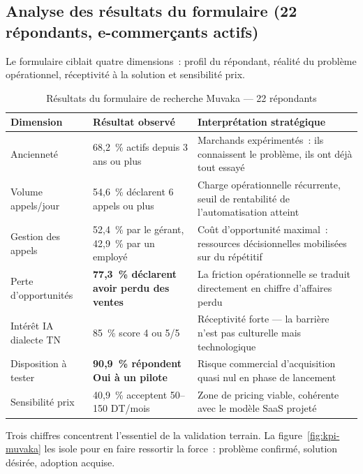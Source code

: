 \subsection{Analyse des résultats du formulaire (22 répondants, e-commerçants actifs)}
\label{section2.4.3}

Le formulaire ciblait quatre dimensions~: profil du répondant, réalité du problème opérationnel, réceptivité à la solution et sensibilité prix.

\begin{table}[H]
\centering
\caption{Résultats du formulaire de recherche Muvaka --- 22 répondants}
\smallskip
\begin{tabular}{|p{2.8cm}|p{4.2cm}|p{4.8cm}|}
\hline
\textbf{Dimension} & \textbf{Résultat observé} & \textbf{Interprétation stratégique} \\
\hline
Ancienneté & 68,2~\% actifs depuis 3 ans ou plus & Marchands expérimentés~: ils connaissent le problème, ils ont déjà tout essayé \\
\hline
Volume appels/jour & 54,6~\% déclarent 6 appels ou plus & Charge opérationnelle récurrente, seuil de rentabilité de l'automatisation atteint \\
\hline
Gestion des appels & 52,4~\% par le gérant, 42,9~\% par un employé & Coût d'opportunité maximal~: ressources décisionnelles mobilisées sur du répétitif \\
\hline
Perte d'opportunités & \textbf{77,3~\% déclarent avoir perdu des ventes} & La friction opérationnelle se traduit directement en chiffre d'affaires perdu \\
\hline
Intérêt IA dialecte TN & 85~\% score 4 ou 5/5 & Réceptivité forte --- la barrière n'est pas culturelle mais technologique \\
\hline
Disposition à tester & \textbf{90,9~\% répondent Oui à un pilote} & Risque commercial d'acquisition quasi nul en phase de lancement \\
\hline
Sensibilité prix & 40,9~\% acceptent 50--150 DT/mois & Zone de pricing viable, cohérente avec le modèle SaaS projeté \\
\hline
\end{tabular}
\end{table}


Trois chiffres concentrent l'essentiel de la validation terrain. La figure~\ref{fig:kpi-muvaka} les isole pour en faire ressortir la force~: problème confirmé, solution désirée, adoption acquise.

